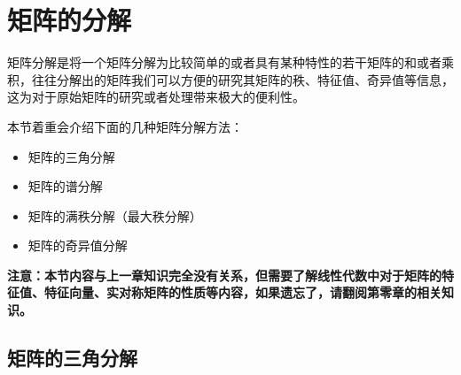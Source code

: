 \documentclass[12pt, a4paper, oneside, UTF8]{ctexbook}
\begin{document}
\else
\fi
\chapter{矩阵的分解}
矩阵分解是将一个矩阵分解为比较简单的或者具有某种特性的若干矩阵的和或者乘积，往往分解出的矩阵我们可以方便的研究其矩阵的秩、特征值、奇异值等信息，这为对于原始矩阵的研究或者处理带来极大的便利性。

本节着重会介绍下面的几种矩阵分解方法：

\begin{itemize}[leftmargin=4em]
    \item 矩阵的三角分解
    \item 矩阵的谱分解
    \item 矩阵的满秩分解（最大秩分解）
    \item 矩阵的奇异值分解
\end{itemize}

\textbf{注意：本节内容与上一章知识完全没有关系，但需要了解线性代数中对于矩阵的特征值、特征向量、实对称矩阵的性质等内容，如果遗忘了，请翻阅第零章的相关知识。}

\section{矩阵的三角分解}

\ifx\allfiles\undefined
\end{document}
